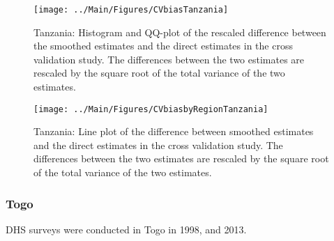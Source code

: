 \documentclass[12pt]{article}\usepackage[]{graphicx}\usepackage[]{color}
\newenvironment{knitrout}{}{} %
\begin{document}
\begin{knitrout}
\color{fgcolor}\begin{figure}[bht]

{\centering \texttt{[image: ../Main/Figures/CVbiasTanzania]} 

}

\caption[Tanzania]{Tanzania: Histogram and QQ-plot of the rescaled difference between the smoothed estimates and the direct estimates in the cross validation study. The differences between the two estimates are rescaled by the square root of the total variance of the two estimates.}\label{fig:unnamed-chunk-309}
\end{figure}


\end{knitrout}

\begin{knitrout}
\color{fgcolor}\begin{figure}[bht]

{\centering \texttt{[image: ../Main/Figures/CVbiasbyRegionTanzania]} 

}

\caption[Tanzania]{Tanzania: Line plot of the difference between smoothed estimates and the direct estimates in the cross validation study. The differences between the two estimates are rescaled by the square root of the total variance of the two estimates.}\label{fig:unnamed-chunk-310}
\end{figure}


\end{knitrout}


\clearpage
\subsubsection{Togo}





DHS surveys were conducted in Togo in 1998, and 2013.
\end{document}
